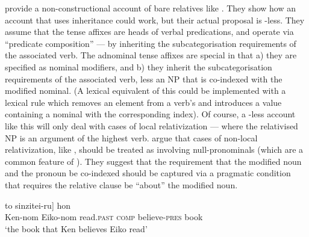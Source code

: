 \documentclass[output=paper
                ,modfonts
                ,nonflat
	        ,collection
	        ,collectionchapter
	        ,collectiontoclongg
 	        ,biblatex
                ,babelshorthands
                ,newtxmath
                ,draftmode
                ,colorlinks, citecolor=brown
]{./langsci/langscibook}
\begin{document}
\cite{SiraiGunjiRelative} provide a non-constructional account of  bare relatives
like . They show how an account that uses  inheritance could
work, but their actual proposal is -less. They assume that the tense affixes
are heads of verbal predications, and operate via ``predicate composition'' --- by
inheriting the subcategorisation requirements of the associated verb. The adnominal tense
affixes are special in that a) they are specified as nominal modifiers, and b) they
inherit the subcategorisation requirements of the associated verb, less an NP that is
co-indexed with the modified nominal. (A lexical equivalent of this could be implemented with a lexical rule which removes an
element from a verb's  and introduces a  value containing a
nominal with the corresponding index). 
Of course, a -less account like this
will only deal with cases of local relativization --- where the relativised NP is an
argument of the highest verb. \citeauthor{SiraiGunjiRelative} argue that cases of
non-local relativization, like , should be treated as involving
null-pronominals (which are a common feature of ). They suggest that the requirement
that the modified noun and the pronoun be co-indexed should be captured via a pragmatic
condition that requires the relative clause be ``about'' the modified noun.
 \begin{exe}\ex\label{x:rc-85}
   \gll [Ken-ga                                  [Eiko-ga     \trace\subscr{i} yon-da] to sinzitei-ru] hon\\
        \hspaceThis{[}Ken-{\sc nom} \hspaceThis{[}Eiko-{\sc nom} {}        read.\textsc{past} \textsc{comp}
          believe-\textsc{pres} book\\
 \glt `the book that Ken believes Eiko read'
 \end{exe}

\end{document}
